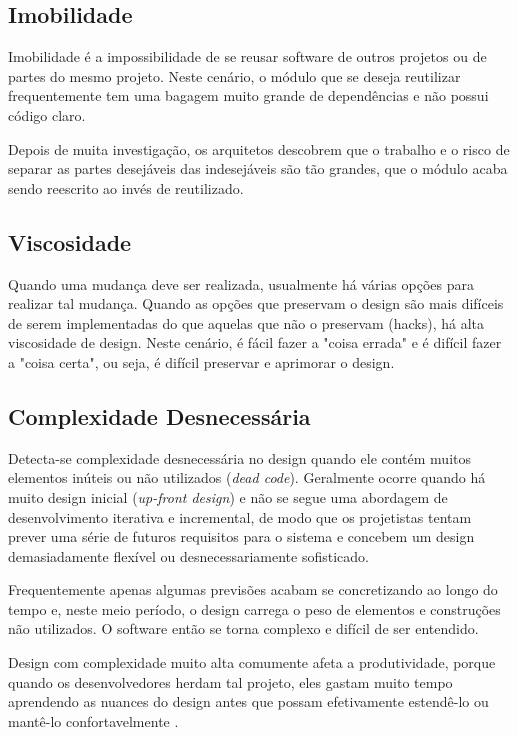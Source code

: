 \subsection{Imobilidade}

Imobilidade é a impossibilidade de se reusar software de outros projetos ou de
partes  do mesmo projeto. Neste cenário, o módulo que se deseja reutilizar 
frequentemente tem uma bagagem muito grande de dependências e não possui código 
claro. 

Depois de muita investigação, os arquitetos descobrem que o trabalho e o risco 
de separar as partes desejáveis das indesejáveis são tão grandes, que o módulo 
acaba sendo reescrito ao invés de reutilizado.

\subsection{Viscosidade}

Quando uma mudança deve ser realizada, usualmente há várias opções para realizar
tal mudança. Quando as opções que preservam o design são mais difíceis de serem
implementadas do que aquelas que não o preservam (hacks), há alta viscosidade 
de design. Neste cenário, é fácil fazer a "coisa errada" e é difícil  fazer a
"coisa certa", ou seja, é difícil preservar e aprimorar o design.

\subsection{Complexidade Desnecessária}

Detecta-se complexidade desnecessária no design quando ele contém muitos 
elementos inúteis ou não utilizados (\textit{dead code}). Geralmente ocorre
quando há muito design inicial (\textit{up-front design}) e não se segue uma 
abordagem de desenvolvimento iterativa e incremental, de modo que os projetistas
tentam prever uma série de futuros requisitos para o sistema e concebem um 
design demasiadamente flexível ou desnecessariamente sofisticado. 

Frequentemente apenas algumas previsões acabam se concretizando ao longo do
tempo e, neste meio período, o design carrega o peso de elementos e construções 
não utilizados. O software então se torna complexo e difícil de ser entendido. 

Design com complexidade muito alta comumente afeta a produtividade, porque 
quando os desenvolvedores herdam tal projeto, eles gastam muito tempo 
aprendendo as nuances do design antes que possam efetivamente  estendê-lo ou
mantê-lo confortavelmente \cite{kerievsky}.

